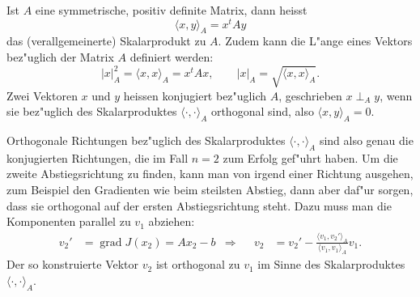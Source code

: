 \begin{definition}
Ist $A$ eine symmetrische, positiv definite Matrix, dann heisst
\[
\langle x,y\rangle_A=x^tAy
\]
das (verallgemeinerte) Skalarprodukt zu $A$.
Zudem kann die L"ange eines Vektors bez"uglich der Matrix $A$ definiert
werden:
\[
|x|_A^2=\langle x,x\rangle_A=x^tAx,\qquad |x|_A=\sqrt{\langle x,x\rangle_A}.
\]
Zwei Vektoren $x$ und $y$ heissen konjugiert bez"uglich $A$,
geschrieben $x\perp_A y$, wenn sie
bez"uglich des Skalarproduktes $\langle\cdot,\cdot\rangle_A$
orthogonal sind, also $\langle x,y\rangle_A=0$.
\end{definition}

Orthogonale Richtungen bez"uglich des Skalarproduktes
$\langle\cdot,\cdot\rangle_A$ sind also genau die konjugierten Richtungen,
die im Fall $n=2$ zum Erfolg gef"uhrt haben.
Um die zweite Abstiegsrichtung  zu finden, kann man von irgend einer Richtung
ausgehen, zum Beispiel den Gradienten wie beim steilsten Abstieg, dann
aber daf"ur sorgen, dass sie orthogonal auf der ersten Abstiegsrichtung
steht.
Dazu muss man die Komponenten parallel zu $v_1$ abziehen:
\begin{align*}
v_2'&=\operatorname{grad}J(x_2)=Ax_2-b
&\Rightarrow&
&
v_2&=v_2'-\frac{\langle v_1,v_2'\rangle_A}{\langle v_1,v_1\rangle_A}v_1.
\end{align*}
Der so konstruierte Vektor $v_2$ ist orthogonal zu $v_1$ im Sinne
des Skalarproduktes $\langle\cdot,\cdot\rangle_A$.

